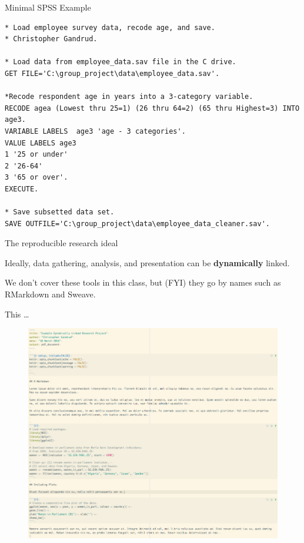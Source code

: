 \documentclass[10pt]{beamer}
\begin{document}
\begin{frame}[fragile]{Minimal SPSS Example}

\begin{lstlisting}
* Load employee survey data, recode age, and save.
* Christopher Gandrud.

* Load data from employee_data.sav file in the C drive.
GET FILE='C:\group_project\data\employee_data.sav'.

*Recode respondent age in years into a 3-category variable.
RECODE agea (Lowest thru 25=1) (26 thru 64=2) (65 thru Highest=3) INTO age3.
VARIABLE LABELS  age3 'age - 3 categories'.
VALUE LABELS age3
1 '25 or under'
2 '26-64'
3 '65 or over'.
EXECUTE.

* Save subsetted data set.
SAVE OUTFILE='C:\group_project\data\employee_data_cleaner.sav'.
\end{lstlisting}

\end{frame}


\begin{frame}{The reproducible research ideal}

    Ideally, data gathering, analysis, and presentation can be \textbf{dynamically} linked.

    \vspace{1cm}

    We don't cover these tools in this class, but (FYI) they go by names such as RMarkdown and Sweave.

\end{frame}

\begin{frame}{This \ldots}

    \begin{figure}
            \includegraphics[scale=0.3]{img/rmarkdown_source.png}
    \end{figure}

\end{frame}
\end{document}
